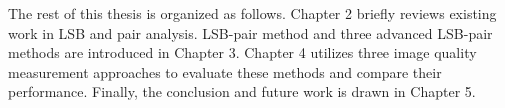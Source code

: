 The rest of this thesis is organized as follows. Chapter 2 briefly reviews existing work in LSB and pair analysis. LSB-pair method and three advanced LSB-pair methods are introduced in Chapter 3. Chapter 4 utilizes three image quality measurement approaches to evaluate these methods and compare their performance. Finally, the conclusion and future work is drawn in Chapter 5.
